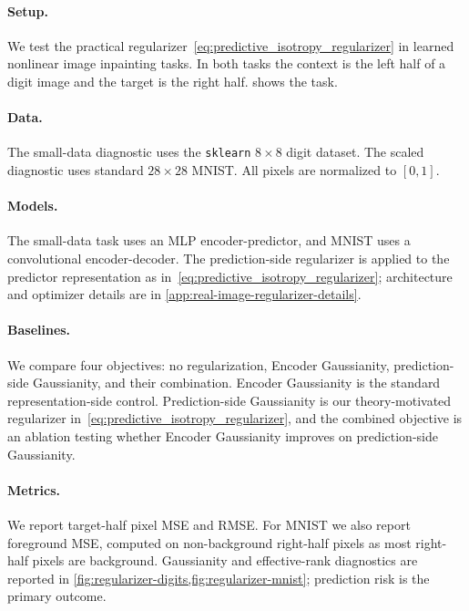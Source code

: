 \paragraph{Setup.}
We test the practical regularizer~\eqref{eq:predictive_isotropy_regularizer}
in learned nonlinear image inpainting tasks. In both tasks the context is the
left half of a digit image and the target is the right half.
 shows the task.

\paragraph{Data.}
The small-data diagnostic uses the \texttt{sklearn} $8\times8$ digit dataset.
The scaled diagnostic uses standard $28\times28$ MNIST. All pixels are
normalized to $[0,1]$.

\paragraph{Models.}
The small-data task uses an MLP encoder-predictor, and MNIST uses a
convolutional encoder-decoder. The prediction-side regularizer is applied to
the predictor representation as in~\eqref{eq:predictive_isotropy_regularizer};
architecture and optimizer details are in
\cref{app:real-image-regularizer-details}.

\paragraph{Baselines.}
We compare four objectives: no regularization, Encoder Gaussianity,
prediction-side Gaussianity, and their combination. Encoder Gaussianity is the
standard representation-side control. Prediction-side Gaussianity is our
theory-motivated regularizer
in~\eqref{eq:predictive_isotropy_regularizer}, and the combined objective is an
ablation testing whether Encoder Gaussianity improves on prediction-side
Gaussianity.

\paragraph{Metrics.}
We report target-half pixel MSE and RMSE. For MNIST we also
report foreground MSE, computed on non-background right-half pixels as most
right-half pixels are background. Gaussianity and effective-rank diagnostics are
reported in \cref{fig:regularizer-digits,fig:regularizer-mnist}; prediction
risk is the primary outcome.


